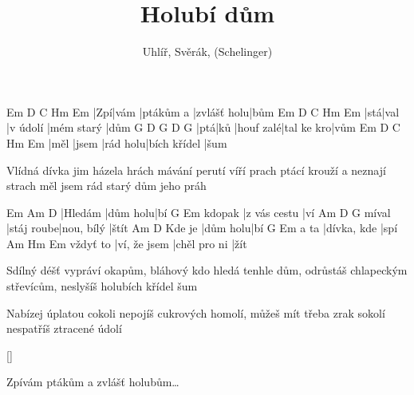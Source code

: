 \documentclass{song}
\title{Holubí dům}
\author{Uhlíř, Svěrák, (Schelinger)}
\begin{document}
\strophe
Em  D    C         Hm          Em
|Zpí|vám |ptákům a |zvlášť holu|bům
Em  D    C        Hm         Em
|stá|val |v údolí |mém starý |dům
G   D   G         D          G
|ptá|ků |houf zalé|tal ke kro|vům
Em   D     C        Hm           Em
|měl |jsem |rád holu|bích křídel |šum
\endstrophe

\strophe*
Vlídná dívka jim házela hrách
mávání perutí víří prach
ptácí krouží a neznají strach
měl jsem rád starý dům jeho práh 
\endstrophe

Em      Am       D
|Hledám |dům holu|bí
       G            Em
kdopak |z vás cestu |ví
      Am         D          G
míval |stáj roube|nou, bílý |štít
       Am       D
Kde je |dům holu|bí
     G           Em
a ta |dívka, kde |spí
         Am           Hm           Em
vždyť to |ví, že jsem |chěl pro ni |žít
\endstrophe

\strophe*
Sdílný déšť vypráví okapům, bláhový kdo
hledá tenhle dům, odrůstáš chlapeckým
střevícům, neslyšíš holubích křídel šum
\endstrophe


\strophe*
Nabízej úplatou cokoli nepojíš cukrových
homolí, můžeš mít třeba zrak sokolí
nespatříš ztracené údolí 
\endstrophe

\ref{}

\strophe*
Zpívám ptákům a zvlášť holubům\ldots
\endstrophe
\end{document}
